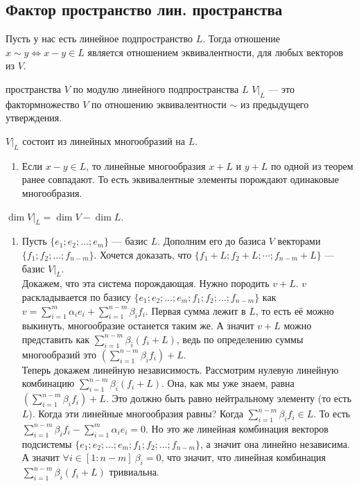 \subsection{Фактор пространство лин. пространства}

Пусть у нас есть линейное подпространство $L$. Тогда отношение $x\sim y\Leftrightarrow x-y\in L$ является отношением эквивалентности, для любых векторов из $V$.

   пространства $V$ {по модулю} линейного {подпространства} $L$ $V\big|_L$ --- это фактормножество $V$ по отношению эквивалентности $\sim$ из предыдущего утверждения.

   $V\big|_L$ состоит из линейных многообразий на $L$.
        \begin{enumerate}
            \item[] \prooff{} 
            Если $x-y\in L$, то линейные многообразия $x+L$ и $y+L$ по одной из теорем ранее совпадают. То есть эквивалентные элементы порождают одинаковые многообразия.
        \end{enumerate}

       
        
        $\dim V\big|_L=\dim V-\dim L$.
        \begin{enumerate}
            \item[] \prooff{} 
            Пусть $\{e_1;e_2;\ldots;e_m\}$ --- базис $L$. Дополним его до базиса $V$ векторами $\{f_1;f_2;\ldots;f_{n-m}\}$. Хочется доказать, что $\{f_1+L;f_2+L;\cdots;f_{n-m}+L\}$ --- базис $V\big|_L$.\\
            Докажем, что эта система порождающая. Нужно породить $v+L$. $v$ раскладывается по базису $\{e_1;e_2;\ldots;e_m;f_1;f_2;\ldots;f_{n-m}\}$ как $v=\sum\limits_{i=1}^m\alpha_ie_i+\sum\limits_{i=1}^{n-m}\beta_if_i$. Первая сумма лежит в $L$, то есть её можно выкинуть, многообразие останется таким же. А значит $v+L$ можно представить как $\sum\limits_{i=1}^{n-m}\beta_i(f_i+L)$, ведь по определению суммы многообразий это $\left(\sum\limits_{i=1}^{n-m}\beta_if_i\right)+L$.\\
            Теперь докажем линейную независимость. Рассмотрим нулевую линейную комбинацию $\sum\limits_{i=1}^{n-m}\beta_i(f_i+L)$. Она, как мы уже знаем, равна $\left(\sum\limits_{i=1}^{n-m}\beta_if_i\right)+L$. Это должно быть равно нейтральному элементу (то есть $L$). Когда эти линейные многообразия равны? Когда $\sum\limits_{i=1}^{n-m}\beta_if_i\in L$. То есть $\sum\limits_{i=1}^{n-m}\beta_if_i-\sum\limits_{i=1}^{m}\alpha_ie_i=0$. Но это же линейная комбинация векторов подсистемы $\{e_1;e_2;\ldots;e_m;f_1;f_2;\ldots;f_{n-m}\}$, а значит она линейно независима. А значит $\forall i\in[1:n-m]~\beta_i=0$, что значит, что линейная комбинация $\sum\limits_{i=1}^{n-m}\beta_i(f_i+L)$ тривиальна.
        \end{enumerate}
        
